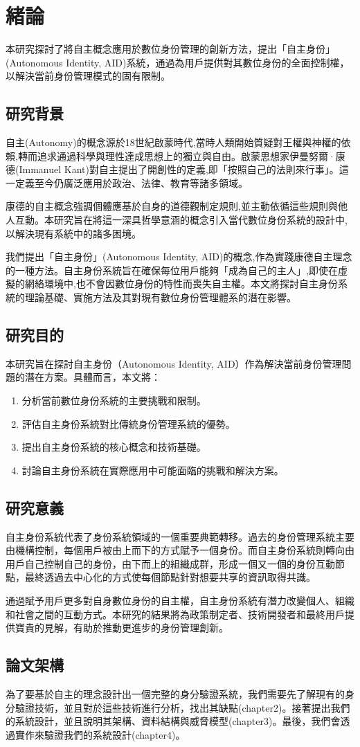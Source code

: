 
\chapter{緒論}
本研究探討了將自主概念應用於數位身份管理的創新方法，提出「自主身份」(Autonomous Identity, AID)系統，通過為用戶提供對其數位身份的全面控制權，以解決當前身份管理模式的固有限制。
\section{研究背景}
自主(Autonomy)的概念源於18世紀啟蒙時代,當時人類開始質疑對王權與神權的依賴,轉而追求通過科學與理性達成思想上的獨立與自由。啟蒙思想家伊曼努爾·康德(Immanuel Kant)對自主提出了開創性的定義,即「按照自己的法則來行事」。這一定義至今仍廣泛應用於政治、法律、教育等諸多領域。

康德的自主概念強調個體應基於自身的道德觀制定規則,並主動依循這些規則與他人互動。本研究旨在將這一深具哲學意涵的概念引入當代數位身份系統的設計中,以解決現有系統中的諸多困境。

我們提出「自主身份」(Autonomous Identity, AID)的概念,作為實踐康德自主理念的一種方法。自主身份系統旨在確保每位用戶能夠「成為自己的主人」,即使在虛擬的網絡環境中,也不會因數位身份的特性而喪失自主權。本文將探討自主身份系統的理論基礎、實施方法及其對現有數位身份管理體系的潛在影響。
\section{研究目的}
本研究旨在探討自主身份（Autonomous Identity, AID）作為解決當前身份管理問題的潛在方案。具體而言，本文將：
\begin{enumerate}
  \item 分析當前數位身份系統的主要挑戰和限制。
  \item 評估自主身份系統對比傳統身份管理系統的優勢。
  \item 提出自主身份系統的核心概念和技術基礎。
  \item 討論自主身份系統在實際應用中可能面臨的挑戰和解決方案。
\end{enumerate}
\section{研究意義}
自主身份系統代表了身份系統領域的一個重要典範轉移。過去的身份管理系統主要由機構控制，每個用戶被由上而下的方式賦予一個身份。而自主身份系統則轉向由用戶自己控制自己的身份，由下而上的組織成群，形成一個又一個的身份互動節點，最終透過去中心化的方式使每個節點針對想要共享的資訊取得共識。

通過賦予用戶更多對自身數位身份的自主權，自主身份系統有潛力改變個人、組織和社會之間的互動方式。本研究的結果將為政策制定者、技術開發者和最終用戶提供寶貴的見解，有助於推動更進步的身份管理創新。
\section{論文架構}
為了要基於自主的理念設計出一個完整的身分驗證系統，我們需要先了解現有的身分驗證技術，並且對於這些技術進行分析，找出其缺點(chapter2)。接著提出我們的系統設計，並且說明其架構、資料結構與威脅模型(chapter3)。最後，我們會透過實作來驗證我們的系統設計(chapter4)。\newpage